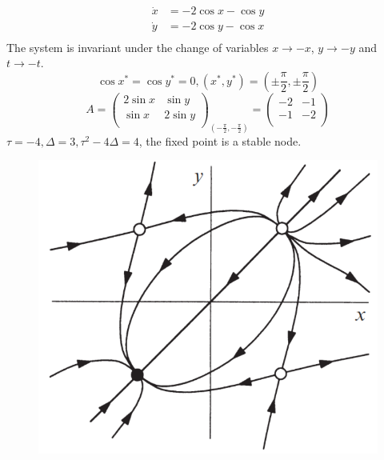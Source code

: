 \documentclass[9pt,aspectratio=43,mathserif,table]{beamer}
\begin{document}
\begin{frame}
	$$
	\begin{aligned}
		\dot{x}&=-2\cos x-\cos y\\
		\dot{y}&=-2\cos y-\cos x\\
	\end{aligned}
	$$
	The system is invariant under the change of variables $x \rightarrow -x$, $y \rightarrow -y$ and $t \rightarrow -t$.
	$$
	\cos x^*=\cos y^*=0,\left( x^*,y^* \right) =\left( \pm \frac{\pi}{2},\pm \frac{\pi}{2} \right) 
	$$
	$$
	A=\left( \begin{matrix}
		2\sin x&		\sin y\\
		\sin x&		2\sin y\\
	\end{matrix} \right) _{\left( -\frac{\pi}{2},-\frac{\pi}{2} \right)}=\left( \begin{matrix}
		-2&		-1\\
		-1&		-2\\
	\end{matrix} \right) 
	$$
	$\tau=-4, \Delta=3, \tau^2-4\Delta=4$, the fixed point is a stable node.
	\begin{figure}
		\centering
		\includegraphics[width=0.4\linewidth]{fig667.jpg}
	\end{figure}
\end{frame}
\end{document}
